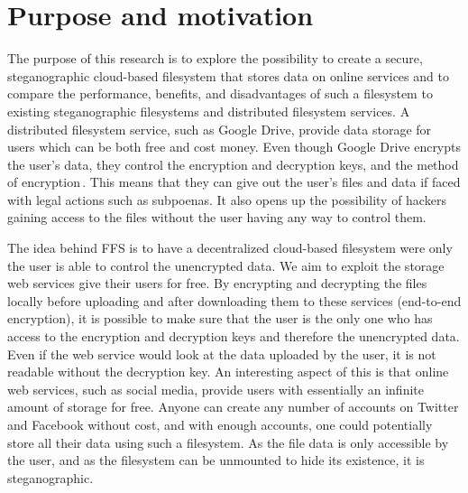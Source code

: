 
\section{Purpose and motivation}

The purpose of this research is to explore the possibility to create a secure, steganographic cloud-based filesystem that stores data on online services and to compare the performance, benefits, and disadvantages of such a filesystem to existing steganographic filesystems and distributed filesystem services. A distributed filesystem service, such as Google Drive, provide data storage for users which can be both free and cost money. Even though Google Drive encrypts the user's data, they control the encryption and decryption keys, and the method of encryption\,\cite{johnsonGoogleDriveSecure2021}. This means that they can give out the user's files and data if faced with legal actions such as subpoenas. It also opens up the possibility of hackers gaining access to the files without the user having any way to control them.

The idea behind FFS is to have a decentralized cloud-based filesystem were only the user is able to control the unencrypted data. We aim to exploit the storage web services give their users for free. By encrypting and decrypting the files locally before uploading and after downloading them to these services (end-to-end encryption), it is possible to make sure that the user is the only one who has access to the encryption and decryption keys and therefore the unencrypted data. Even if the web service would look at the data uploaded by the user, it is not readable without the decryption key. An interesting aspect of this is that online web services, such as social media, provide users with essentially an infinite amount of storage for free. Anyone can create any number of accounts on Twitter and Facebook without cost, and with enough accounts, one could potentially store all their data using such a filesystem. As the file data is only accessible by the user, and as the filesystem can be unmounted to hide its existence, it is steganographic. 

